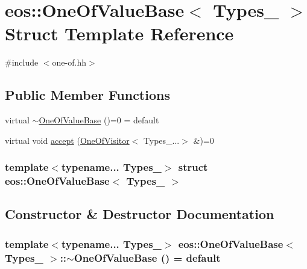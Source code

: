 \hypertarget{structeos_1_1OneOfValueBase}{
\section{eos::OneOfValueBase$<$ Types\_\- $>$ Struct Template Reference}
\label{structeos_1_1OneOfValueBase}
}


{\ttfamily \#include $<$one-\/of.hh$>$}\subsection*{Public Member Functions}
\begin{DoxyCompactItemize}
\item 
virtual \hyperlink{structeos_1_1OneOfValueBase_a1587f8d32e61d2257084ffb6890e110b}{$\sim$OneOfValueBase} ()=0 = default
\item 
virtual void \hyperlink{structeos_1_1OneOfValueBase_ad591bb797392ce70f45001d92d6c95bc}{accept} (\hyperlink{structeos_1_1OneOfVisitor}{OneOfVisitor}$<$ Types\_\-...$>$ \&)=0
\end{DoxyCompactItemize}
\subsubsection*{template$<$typename... Types\_\-$>$ struct eos::OneOfValueBase$<$ Types\_\- $>$}



\subsection{Constructor \& Destructor Documentation}
\hypertarget{structeos_1_1OneOfValueBase_a1587f8d32e61d2257084ffb6890e110b}{
\subsubsection[{$\sim$OneOfValueBase}]{\setlength{\rightskip}{0pt plus 5cm}template$<$typename... Types\_\-$>$ {\bf eos::OneOfValueBase}$<$ Types\_\- $>$::$\sim${\bf OneOfValueBase} () = default}}
\label{structeos_1_1OneOfValueBase_a1587f8d32e61d2257084ffb6890e110b}


